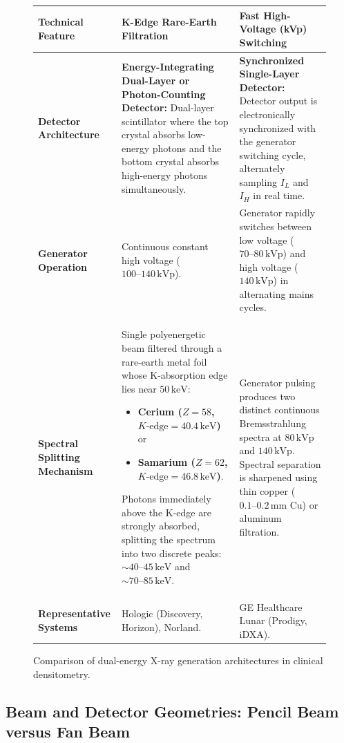 \documentclass[11pt,a4paper]{article}
\begin{document}
\begin{figure}[htbp]
\centering
\setlength{\tabcolsep}{4pt}
\begin{tabular}{p{3.5cm}p{5.6cm}p{5.6cm}}
\toprule
\textbf{Technical Feature} & \textbf{K-Edge Rare-Earth Filtration} & \textbf{Fast High-Voltage (kVp) Switching} \\
\midrule
\textbf{Detector Architecture} & \textbf{Energy-Integrating Dual-Layer or Photon-Counting Detector:} Dual-layer scintillator where the top crystal absorbs low-energy photons and the bottom crystal absorbs high-energy photons simultaneously. & \textbf{Synchronized Single-Layer Detector:} Detector output is electronically synchronized with the generator switching cycle, alternately sampling $I_L$ and $I_H$ in real time. \\
\addlinespace
\textbf{Generator Operation} & Continuous constant high voltage ($100\text{--}140\,\text{kVp}$). & Generator rapidly switches between low voltage ($70\text{--}80\,\text{kVp}$) and high voltage ($140\,\text{kVp}$) in alternating mains cycles. \\
\addlinespace
\textbf{Spectral Splitting Mechanism} & Single polyenergetic beam filtered through a rare-earth metal foil whose K-absorption edge lies near $50\,\text{keV}$:
\begin{itemize}[leftmargin=*]
    \item \textbf{Cerium ($Z=58$, $K\text{-edge} = 40.4\,\text{keV}$)} or
    \item \textbf{Samarium ($Z=62$, $K\text{-edge} = 46.8\,\text{keV}$)}.
\end{itemize}
Photons immediately above the K-edge are strongly absorbed, splitting the spectrum into two discrete peaks: $\sim 40\text{--}45\,\text{keV}$ and $\sim 70\text{--}85\,\text{keV}$. & Generator pulsing produces two distinct continuous Bremsstrahlung spectra at $80\,\text{kVp}$ and $140\,\text{kVp}$. Spectral separation is sharpened using thin copper ($0.1\text{--}0.2\,\text{mm Cu}$) or aluminum filtration. \\
\addlinespace
\textbf{Representative Systems} & Hologic (Discovery, Horizon), Norland. & GE Healthcare Lunar (Prodigy, iDXA). \\
\bottomrule
\end{tabular}
\caption{Comparison of dual-energy X-ray generation architectures in clinical densitometry.}
\label{tab:dual_energy_methods}
\end{figure}

\subsection{Beam and Detector Geometries: Pencil Beam versus Fan Beam}
\end{document}
